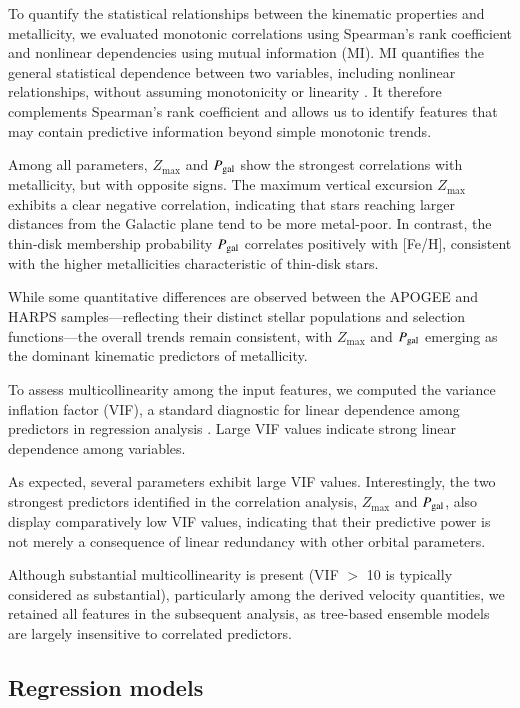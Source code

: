 \documentclass{aa}
\begin{document}
To quantify the statistical relationships between the kinematic properties and metallicity, we evaluated monotonic correlations using Spearman’s rank coefficient \citep{spearman1904} and nonlinear dependencies using mutual information (MI). MI quantifies the general statistical dependence between two variables, including nonlinear relationships, without assuming monotonicity or linearity \citep{shannon1948}. It therefore complements Spearman’s rank coefficient and allows us to identify features that may contain predictive information beyond simple monotonic trends.

Among all parameters, $Z_{\max}$ and $P_{\rm gal}$ show the strongest correlations with metallicity, but with opposite signs. The maximum vertical excursion $Z_{\max}$ exhibits a clear negative correlation, indicating that stars reaching larger distances from the Galactic plane tend to be more metal-poor. In contrast, the thin-disk membership probability $P_{\rm gal}$ correlates positively with [Fe/H], consistent with the higher metallicities characteristic of thin-disk stars.

While some quantitative differences are observed between the APOGEE and HARPS samples—reflecting their distinct stellar populations and selection functions—the overall trends remain consistent, with $Z_{\max}$ and $P_{\rm gal}$ emerging as the dominant kinematic predictors of metallicity.

To assess multicollinearity among the input features, we computed the variance inflation factor (VIF), a standard diagnostic for linear dependence among predictors in regression analysis \citep{farrar1967}. Large VIF values indicate strong linear dependence among variables.

As expected, several parameters exhibit large VIF values. Interestingly, the two strongest predictors identified in the correlation analysis, $Z_{\max}$ and $P_{\rm gal}$, also display comparatively low VIF values, indicating that their predictive power is not merely a consequence of linear redundancy with other orbital parameters.

Although substantial multicollinearity is present (VIF $>$ 10 is typically considered as substantial), particularly among the derived velocity quantities, we retained all features in the subsequent analysis, as tree-based ensemble models are largely insensitive to correlated predictors. 


\subsection{Regression models}
\end{document}
